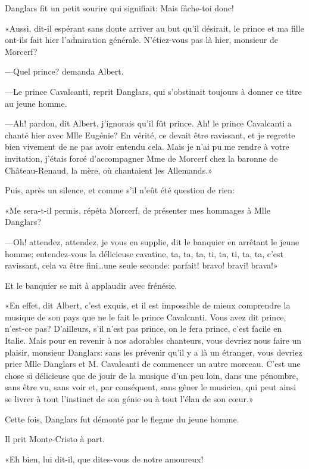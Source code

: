 Danglars fit un petit sourire qui signifiait: Mais fâche-toi donc! 

«Aussi, dit-il espérant sans doute arriver au but qu'il désirait, le prince et ma fille ont-ils fait hier l'admiration générale. N'étiez-vous pas là hier, monsieur de Morcerf? 

—Quel prince? demanda Albert. 

—Le prince Cavalcanti, reprit Danglars, qui s'obstinait toujours à donner ce titre au jeune homme. 

—Ah! pardon, dit Albert, j'ignorais qu'il fût prince. Ah! le prince Cavalcanti a chanté hier avec Mlle Eugénie? En vérité, ce devait être ravissant, et je regrette bien vivement de ne pas avoir entendu cela. Mais je n'ai pu me rendre à votre invitation, j'étais forcé d'accompagner Mme de Morcerf chez la baronne de Château-Renaud, la mère, où chantaient les Allemands.» 

Puis, après un silence, et comme s'il n'eût été question de rien: 

«Me sera-t-il permis, répéta Morcerf, de présenter mes hommages à Mlle Danglars? 

—Oh! attendez, attendez, je vous en supplie, dit le banquier en arrêtant le jeune homme; entendez-vous la délicieuse cavatine, ta, ta, ta, ti, ta, ti, ta, ta, c'est ravissant, cela va être fini\dots une seule seconde: parfait! bravo! bravi! brava!» 

Et le banquier se mit à applaudir avec frénésie. 

«En effet, dit Albert, c'est exquis, et il est impossible de mieux comprendre la musique de son pays que ne le fait le prince Cavalcanti. Vous avez dit prince, n'est-ce pas? D'ailleurs, s'il n'est pas prince, on le fera prince, c'est facile en Italie. Mais pour en revenir à nos adorables chanteurs, vous devriez nous faire un plaisir, monsieur Danglars: sans les prévenir qu'il y a là un étranger, vous devriez prier Mlle Danglars et M. Cavalcanti de commencer un autre morceau. C'est une chose si délicieuse que de jouir de la musique d'un peu loin, dans une pénombre, sans être vu, sans voir et, par conséquent, sans gêner le musicien, qui peut ainsi se livrer à tout l'instinct de son génie ou à tout l'élan de son cœur.» 

Cette fois, Danglars fut démonté par le flegme du jeune homme. 

Il prit Monte-Cristo à part. 

«Eh bien, lui dit-il, que dites-vous de notre amoureux! 

